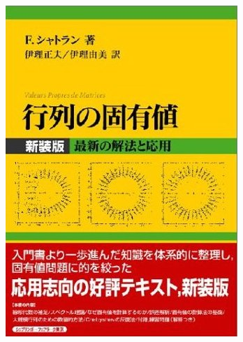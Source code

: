 \begin{frame}
\begin{center}
    \includegraphics[height=0.6\textheight]{figure/book.jpg}
  \end{center}
\end{frame}

